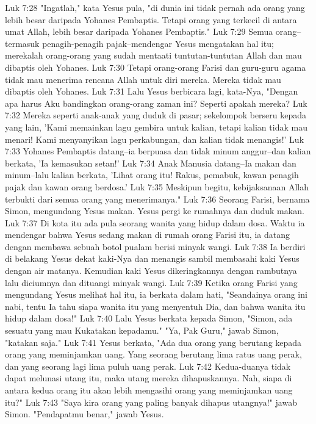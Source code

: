 Luk 7:28  "Ingatlah," kata Yesus pula, "di dunia ini tidak pernah ada orang yang lebih besar daripada Yohanes Pembaptis. Tetapi orang yang terkecil di antara umat Allah, lebih besar daripada Yohanes Pembaptis."
Luk 7:29  Semua orang--termasuk penagih-penagih pajak--mendengar Yesus mengatakan hal itu; merekalah orang-orang yang sudah mentaati tuntutan-tuntutan Allah dan mau dibaptis oleh Yohanes.
Luk 7:30  Tetapi orang-orang Farisi dan guru-guru agama tidak mau menerima rencana Allah untuk diri mereka. Mereka tidak mau dibaptis oleh Yohanes.
Luk 7:31  Lalu Yesus berbicara lagi, kata-Nya, "Dengan apa harus Aku bandingkan orang-orang zaman ini? Seperti apakah mereka?
Luk 7:32  Mereka seperti anak-anak yang duduk di pasar; sekelompok berseru kepada yang lain, 'Kami memainkan lagu gembira untuk kalian, tetapi kalian tidak mau menari! Kami menyanyikan lagu perkabungan, dan kalian tidak menangis!'
Luk 7:33  Yohanes Pembaptis datang--ia berpuasa dan tidak minum anggur--dan kalian berkata, 'Ia kemasukan setan!'
Luk 7:34  Anak Manusia datang--Ia makan dan minum--lalu kalian berkata, 'Lihat orang itu! Rakus, pemabuk, kawan penagih pajak dan kawan orang berdosa.'
Luk 7:35  Meskipun begitu, kebijaksanaan Allah terbukti dari semua orang yang menerimanya."
Luk 7:36  Seorang Farisi, bernama Simon, mengundang Yesus makan. Yesus pergi ke rumahnya dan duduk makan.
Luk 7:37  Di kota itu ada pula seorang wanita yang hidup dalam dosa. Waktu ia mendengar bahwa Yesus sedang makan di rumah orang Farisi itu, ia datang dengan membawa sebuah botol pualam berisi minyak wangi.
Luk 7:38  Ia berdiri di belakang Yesus dekat kaki-Nya dan menangis sambil membasahi kaki Yesus dengan air matanya. Kemudian kaki Yesus dikeringkannya dengan rambutnya lalu diciumnya dan dituangi minyak wangi.
Luk 7:39  Ketika orang Farisi yang mengundang Yesus melihat hal itu, ia berkata dalam hati, "Seandainya orang ini nabi, tentu Ia tahu siapa wanita itu yang menyentuh Dia, dan bahwa wanita itu hidup dalam dosa!"
Luk 7:40  Lalu Yesus berkata kepada Simon, "Simon, ada sesuatu yang mau Kukatakan kepadamu." "Ya, Pak Guru," jawab Simon, "katakan saja."
Luk 7:41  Yesus berkata, "Ada dua orang yang berutang kepada orang yang meminjamkan uang. Yang seorang berutang lima ratus uang perak, dan yang seorang lagi lima puluh uang perak.
Luk 7:42  Kedua-duanya tidak dapat melunasi utang itu, maka utang mereka dihapuskannya. Nah, siapa di antara kedua orang itu akan lebih mengasihi orang yang meminjamkan uang itu?"
Luk 7:43  "Saya kira orang yang paling banyak dihapus utangnya!" jawab Simon. "Pendapatmu benar," jawab Yesus.

